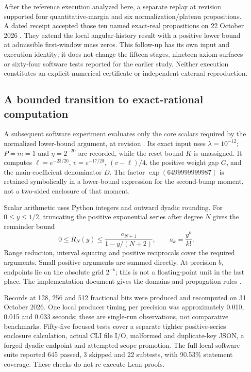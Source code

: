 \documentclass[11pt,a4paper]{article}
\begin{document}
After the reference execution analyzed here, a separate replay at revision  supported four quantitative-margin and six normalization/plateau propositions. A dated receipt accepted those ten named exact-real propositions on 22 October 2026 \cite{ref12}. They extend the local angular-history result with a positive lower bound at admissible first-window mass zeros. This follow-up has its own input and execution identity; it does not change the fifteen stages, nineteen axiom surfaces or sixty-four software tests reported for the earlier study. Neither execution constitutes an explicit numerical certificate or independent external reproduction.

\subsection{A bounded transition to exact-rational computation}

A subsequent software experiment evaluates only the core scalars required by the normalized lower-bound argument, at revision . Its exact input uses $\lambda=10^{-12}$; $P=m=1$ and $\eta=2^{-20}$ are recorded, while the reset bound $K$ is unassigned. It computes $\ell=e^{-23/20}$, $v=e^{-17/20}$, $(v-\ell)/4$, the positive weight gap $G$, and the main-coefficient denominator $D$. The factor $\exp(6499999999987)$ is retained symbolically in a lower-bound expression for the second-bump moment, not a two-sided enclosure of that moment.

Scalar arithmetic uses Python  integers and outward dyadic rounding. For $0\le y\le1/2$, truncating the positive exponential series after degree $N$ gives the remainder bound
\[
0\le R_N(y)\le \frac{a_{N+1}}{1-y/(N+2)},\qquad a_k=\frac{y^k}{k!}.
\]
Range reduction, interval squaring and positive reciprocals cover the required arguments. Small positive  arguments are summed directly. At precision $b$, endpoints lie on the absolute grid $2^{-b}$; this is not a floating-point unit in the last place. The implementation document gives the domains and propagation rules \cite{ref13}.

Records at 128, 256 and 512 fractional bits were produced and recomputed on 31 October 2026. One local producer timing per precision was approximately 0.010, 0.015 and 0.033 seconds; these are single-run observations, not comparative benchmarks. Fifty-five focused tests cover a separate tighter positive-series enclosure calculation, actual CLI file I/O, malformed and duplicate-key JSON, a forged dyadic endpoint and attempted scope promotion. The full local software suite reported 645 passed, 3 skipped and 22 subtests, with 90.53\% statement coverage. These checks do not re-execute Lean proofs.
\end{document}
